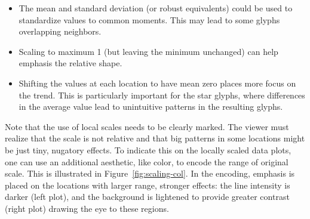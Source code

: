 \documentclass[oneside]{article}
\begin{document}
\begin{itemize} \itemsep 0in

\item The mean and standard deviation (or robust equivalents) could be
  used to standardize values to common moments. This may lead to some
  glyphs overlapping neighbors.
  
   \item Scaling to maximum 1 (but leaving the minimum unchanged) can help
  emphasis the relative shape.

  \item Shifting the values at each location to have mean zero places more
  focus on the trend. This is particularly important for the star glyphs,
  where differences in the average value lead to unintuitive patterns in the
  resulting glyphs.

\end{itemize}

Note that the use of local scales needs to be clearly marked. The viewer must realize that the scale is not relative and that big patterns in some locations might be just tiny, nugatory effects. To indicate this on the locally scaled data plots, one can use an additional aesthetic, like color, to encode the range of original scale. This is illustrated in Figure~\ref{fig:scaling-col}. In the encoding, emphasis is placed on the locations with larger range, stronger effects: the line intensity is darker (left plot), and the background is lightened to provide greater contrast (right plot) drawing the eye to these regions. 
\end{document}
